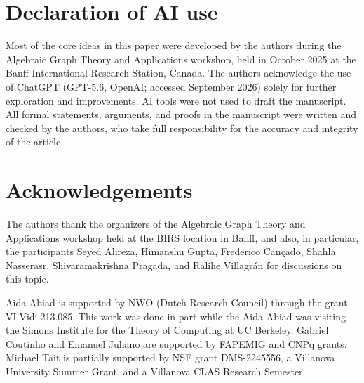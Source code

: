 \documentclass[10pt,a4paper]{article}
\theoremstyle{plain}
\numberwithin{equation}{section}
\begin{document}
\section*{Declaration of AI use}
Most of the core ideas in this paper were developed by the authors during the Algebraic Graph Theory and Applications workshop, held in  
October 2025 at the 
Banff International Research Station, Canada. The authors acknowledge the use of ChatGPT (GPT-5.6, OpenAI; accessed September 2026) solely for further exploration and improvements. AI tools were not used to draft the manuscript. All formal statements, arguments, and proofs in the manuscript were written and checked by the authors, who take full responsibility for the accuracy and integrity of the article. 

\section*{Acknowledgements}
The authors thank the organizers of the Algebraic Graph Theory and Applications workshop held at the BIRS location in Banff, and also, in particular, the participants Seyed Alireza,  Himanshu Gupta, Frederico Cançado, Shahla Nasserasr, Shivaramakrishna Pragada, and Ralihe Villagr\'an for discussions on this topic.


Aida Abiad is supported by NWO (Dutch Research Council) through the grant VI.Vidi.213.085. This work was done in part while the Aida Abiad was visiting the Simons Institute for the Theory of Computing at UC Berkeley. Gabriel Coutinho and Emanuel Juliano are supported by FAPEMIG and CNPq grants. Michael Tait is partially supported by NSF grant DMS-2245556, a Villanova University Summer Grant, and a Villanova CLAS Research Semester. 



\end{document}
